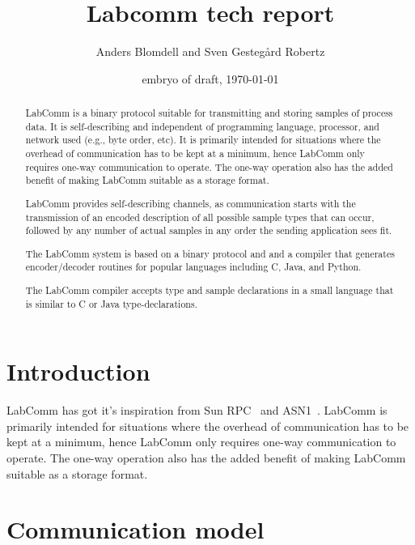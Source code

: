 \documentclass[a4paper]{article}
\begin{document}
\title{Labcomm tech report}
\author{Anders Blomdell and Sven Gesteg\aa{}rd Robertz }
\date{embryo of draft, \today}

\maketitle 

\begin{abstract}

LabComm is a binary protocol suitable for transmitting and storing samples of
process data. It is self-describing and independent of programming language,
processor, and network used (e.g., byte order, etc).  It is primarily intended
for situations where the overhead of communication has to be kept at a minimum,
hence LabComm only requires one-way communication to operate. The one-way
operation also has the added benefit of making LabComm suitable as a storage
format. 

LabComm provides self-describing channels, as communication starts with the
transmission of an encoded description of all possible sample types that can
occur, followed by any number of actual samples in any order the sending
application sees fit.

The LabComm system is based on a binary protocol and
and a compiler that generates encoder/decoder routines for popular languages
including C, Java, and Python.

The LabComm compiler accepts type and sample declarations in a small language
that is similar to C or Java type-declarations. 
\end{abstract}
\section{Introduction}


LabComm has got it's inspiration from Sun RPC~\cite{SunRPC}
and ASN1~\cite{ANS1}. LabComm is primarily intended for situations
where the overhead of communication has to be kept at a minimum, hence LabComm
only requires one-way communication to operate. The one-way operation also has
the added benefit of making LabComm suitable as a storage format. 

\section{Communication model}
\end{document}
